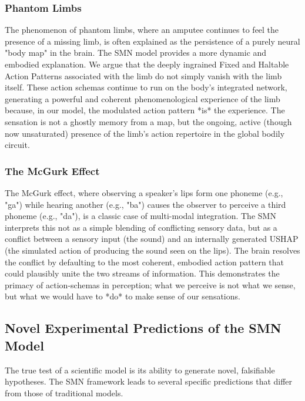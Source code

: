 \subsubsection{Phantom Limbs}
\label{ssubsec:phantom_limbs}
The phenomenon of phantom limbs, where an amputee continues to feel the presence of a missing limb, is often explained as the persistence of a purely neural "body map" in the brain. The SMN model provides a more dynamic and embodied explanation. We argue that the deeply ingrained Fixed and Haltable Action Patterns associated with the limb do not simply vanish with the limb itself. These action schemas continue to run on the body's integrated network, generating a powerful and coherent phenomenological experience of the limb because, in our model, the modulated action pattern *is* the experience. The sensation is not a ghostly memory from a map, but the ongoing, active (though now unsaturated) presence of the limb's action repertoire in the global bodily circuit.

\subsubsection{The McGurk Effect}
\label{ssubsec:mcgurk}
The McGurk effect, where observing a speaker's lips form one phoneme (e.g., "ga") while hearing another (e.g., "ba") causes the observer to perceive a third phoneme (e.g., "da"), is a classic case of multi-modal integration. The SMN interprets this not as a simple blending of conflicting sensory data, but as a conflict between a sensory input (the sound) and an internally generated USHAP (the simulated action of producing the sound seen on the lips). The brain resolves the conflict by defaulting to the most coherent, embodied action pattern that could plausibly unite the two streams of information. This demonstrates the primacy of action-schemas in perception; what we perceive is not what we sense, but what we would have to *do* to make sense of our sensations.

\subsection{Novel Experimental Predictions of the SMN Model}
\label{subsec:predictions}
The true test of a scientific model is its ability to generate novel, falsifiable hypotheses. The SMN framework leads to several specific predictions that differ from those of traditional models.

